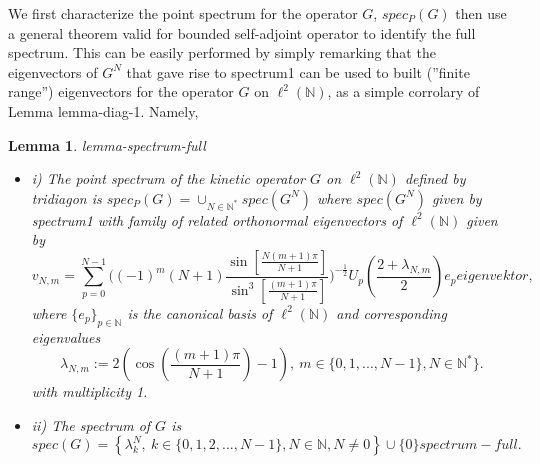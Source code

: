 \documentclass[10pt]{book}
\theoremstyle{break}
\newtheorem{lemma}{Lemma}
\begin{document}
We first characterize the point spectrum for the operator $G$, $spec_P(G)$ then use a general theorem valid for bounded self-adjoint operator to identify the full spectrum. This can be easily performed by simply remarking that the eigenvectors of $G^N$ that gave rise to {spectrum1} can be used to built (''finite range'') eigenvectors for the operator $G$ on $\ell^2(\mathbb{N})$, as a simple corrolary of Lemma {lemma-diag-1}. Namely, 
\begin{lemma}{lemma-spectrum-full} 
\begin{itemize}
\setlength{\itemsep}{-1pt}
\item i) The point spectrum of the kinetic operator $G$ on $\ell^2(\mathbb{N})$ defined by {tridiagon} is $spec_P(G)=\cup_{N\in\mathbb{N}^*}spec(G^N)$ where $spec(G^N)$ given by {spectrum1} with family of related orthonormal eigenvectors of $\ell^2(\mathbb{N})$ given by 
\begin{equation*}
v_{N,m}=\sum_{p=0}^{N-1}\bigg((-1)^m(N+1){\frac{ \sin[{\frac{N(m+1)\pi }{N+1 }}  ]}{\sin^3[{\frac{(m+1)\pi }{N+1 }} ] }} \bigg)^{-{\frac12}}  U_p\left({\frac{2+\lambda_{N,m}}{2}}\right)e_p{eigenvektor},
\end{equation*}
where $\{e_p\}_{p\in\mathbb{N}}$ is the canonical basis of $\ell^2(\mathbb{N})$ and corresponding eigenvalues
\begin{equation*}
\lambda_{N,m}:=2\left(\cos\left({\frac{(m+1)\pi}{N+1}}\right)-1\right), \ m\in\{0,1,...,N-1\}, N\in\mathbb{N}^*\}.
\end{equation*}
with multiplicity 1.
\item ii) The spectrum of $G$ is 
\begin{equation*}
spec(G)=\left\{\lambda^N_k,\ k\in\{0,1,2,...,N-1\}, N\in\mathbb{N}, N\ne0 \right\}\cup\{0\}{spectrum-full}.
\end{equation*}
\end{itemize}
\end{lemma}
\end{document}
